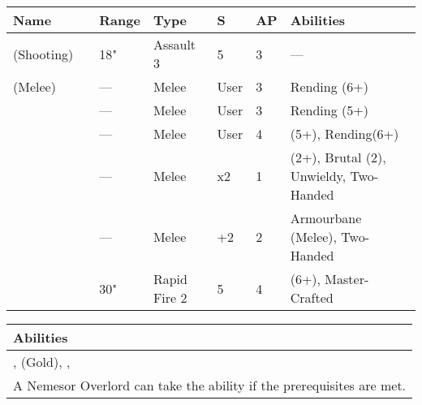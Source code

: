 \noindent
\begin{tabular}{||m{110pt} m{30pt} m{31pt} m{55pt} m{12pt} m{12pt} m{210pt}||}
	\hline
	Name & & Range & Type & S & AP & Abilities \\
	\hline
	\quickref{Staff of Light} (Shooting) & & 18" & Assault 3 & 5 & 3 & — \\
	\quickref{Staff of Light} (Melee) & & — & Melee & User & 3 & Rending (6+) \\
	\quickref{Hyperphase Sword} &  & — & Melee & User & 3 & Rending (5+) \\
	\quickref{Voidblade} &  & — & Melee & User & 4 & \quickref{Entropic Strike} (5+), Rending(6+) \\
	\quickref{Voidscythe} &  & — & Melee & x2 & 1 & \quickref{Entropic Strike} (2+), Brutal (2), Unwieldy, Two-Handed \\
	\quickref{Warscythe} &  & — & Melee & +2 & 2 & Armourbane (Melee), Two-Handed \\
	\quickref{Relic Gauss Blaster} & & 30" & Rapid Fire 2 & 5 & 4 & \quickref{Gauss} (6+), Master-Crafted \\
	\hline
\end{tabular}

\noindent
\begin{tabular}{||m{532pt}||}
	\hline
	Abilities \\
	\hline
	\quickref{Command Protocols}, \quickref{Nodal Command}(Gold), \quickref{Living Metal}, \quickref{Reanimation Protocols} \\
	A Nemesor Overlord can take the \quickref{Tesserarion Nemesor} ability if the prerequisites are met. \\
	\hline
\end{tabular}



\newpage
{}

